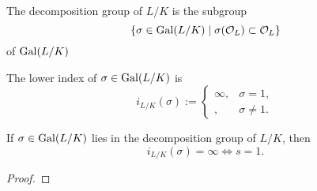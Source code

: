 \begin{definition}
    \label{decompositionGroup}
    \leanok
    The decomposition group of $L/K$ is the subgroup \[\{\sigma\in\operatorname{Gal}(L/K)\mid \sigma(\mathcal{O}_L) \subset \mathcal{O}_L\}\] of $\operatorname{Gal}(L/K)$ 
\end{definition}

\begin{definition}\label{lowerIndex}
    \leanok
    The lower index of $\sigma\in\operatorname{Gal}(L/K)$ is \[i_{L/K}(\sigma) := \begin{cases}
        \infty, &\sigma = 1,\\
        , &\sigma\ne 1.
    \end{cases}\]
\end{definition}

\begin{theorem}
    \label{lowerIndex_ne_one}
\end{theorem}

\begin{theorem}
    \label{lowerIndex_eq_top_iff_eq_refl}
    \leanok
    If $\sigma\in\operatorname{Gal}(L/K)$ lies in the decomposition group of $L/K$, then \[i_{L/K}(\sigma) = \infty\iff s = 1.\]
\end{theorem}
\begin{proof}
\end{proof}
